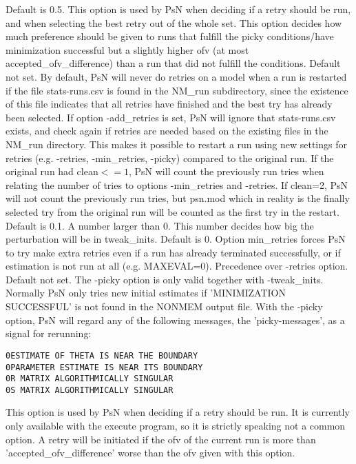 \begin{optionlist}
Default is 0.5. This option is used by PsN when deciding if a retry should be run, and when selecting the best retry out of the whole set. This option decides how much preference should be given to runs that fulfill the picky conditions/have minimization successful but a slightly higher ofv (at most accepted\_ofv\_difference) than a run that did not fulfill the conditions.  
\nextopt
{}
Default not set. By default, PsN will never do retries on a model when a run is restarted if the file stats-runs.csv is found in the NM\_run subdirectory, since the existence of this file indicates that all retries have finished and the best try has already been selected. If option -add\_retries is set, PsN will ignore that stats-runs.csv exists, and check again if retries are needed based on the existing files in the NM\_run directory. This makes it possible to restart a run using new settings for retries (e.g. -retries, -min\_retries, -picky) compared to the original run. If the original run had clean$<=1$, PsN will count the previously run tries when relating the number of tries to options -min\_retries and -retries. If clean=2, PsN will not count the previously run tries, but psn.mod which in reality is the finally selected try from the original run will be counted as the first try in the restart.  
\nextopt
{}
Default is 0.1. A number larger than 0. This number decides how big the perturbation will be in tweak\_inits.
\nextopt
{}
Default is 0. Option min\_retries forces PsN to try make extra retries even if a run has already terminated successfully, or if estimation is not run at all (e.g. MAXEVAL=0). Precedence over -retries option.  
\nextopt
{}
Default not set. The -picky option is only valid together with -tweak\_inits. Normally PsN only tries new initial estimates if 'MINIMIZATION SUCCESSFUL' is not found in the NONMEM output file. With the -picky option, PsN will regard any of the following messages, the 'picky-messages', as a signal for rerunning:
\begin{verbatim}
0ESTIMATE OF THETA IS NEAR THE BOUNDARY
0PARAMETER ESTIMATE IS NEAR ITS BOUNDARY
0R MATRIX ALGORITHMICALLY SINGULAR
0S MATRIX ALGORITHMICALLY SINGULAR
\end{verbatim}
\nextopt
{}
This option is used by PsN when deciding if a retry should be run. It is currently only available with the execute program, so it is strictly speaking not a common option. A retry will be initiated if the ofv of the current run is more than 'accepted\_ofv\_difference' worse than the ofv given with this option.

\end{optionlist}
